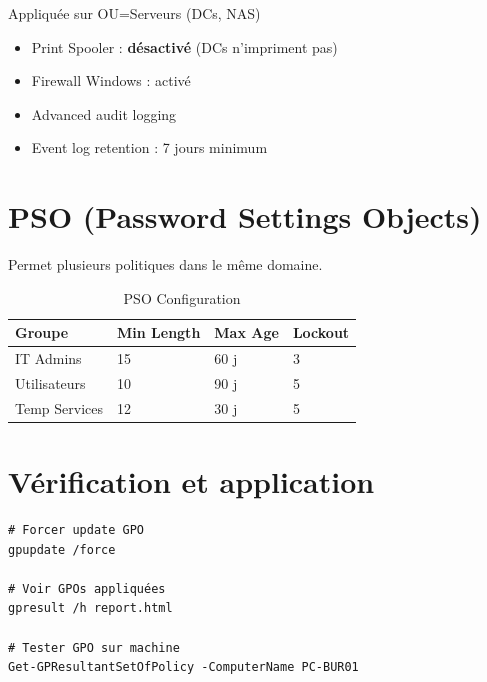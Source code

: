Appliquée sur OU=Serveurs (DCs, NAS)

\begin{itemize}
    \item Print Spooler : \textbf{désactivé} (DCs n'impriment pas)
    \item Firewall Windows : activé
    \item Advanced audit logging
    \item Event log retention : 7 jours minimum
\end{itemize}

\section{PSO (Password Settings Objects)}

Permet plusieurs politiques dans le même domaine.

\begin{table}[H]
    \centering
    \begin{tabularx}{\textwidth}{|l|l|l|l|}
        \hline
        \textbf{Groupe} & \textbf{Min Length} & \textbf{Max Age} & \textbf{Lockout} \\
        \hline
        IT Admins & 15 & 60 j & 3 \\
        \hline
        Utilisateurs & 10 & 90 j & 5 \\
        \hline
        Temp Services & 12 & 30 j & 5 \\
        \hline
    \end{tabularx}
    \caption{PSO Configuration}
    \label{tab:pso}
\end{table}

\section{Vérification et application}

\begin{lstlisting}[style=powershell]
# Forcer update GPO
gpupdate /force

# Voir GPOs appliquées
gpresult /h report.html

# Tester GPO sur machine
Get-GPResultantSetOfPolicy -ComputerName PC-BUR01
\end{lstlisting}
